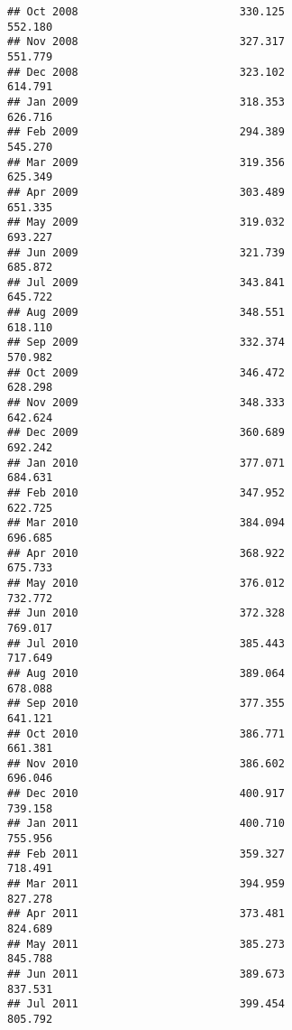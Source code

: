 \documentclass[
]{article}
\begin{document}
\begin{verbatim}
## Oct 2008                         330.125                           552.180
## Nov 2008                         327.317                           551.779
## Dec 2008                         323.102                           614.791
## Jan 2009                         318.353                           626.716
## Feb 2009                         294.389                           545.270
## Mar 2009                         319.356                           625.349
## Apr 2009                         303.489                           651.335
## May 2009                         319.032                           693.227
## Jun 2009                         321.739                           685.872
## Jul 2009                         343.841                           645.722
## Aug 2009                         348.551                           618.110
## Sep 2009                         332.374                           570.982
## Oct 2009                         346.472                           628.298
## Nov 2009                         348.333                           642.624
## Dec 2009                         360.689                           692.242
## Jan 2010                         377.071                           684.631
## Feb 2010                         347.952                           622.725
## Mar 2010                         384.094                           696.685
## Apr 2010                         368.922                           675.733
## May 2010                         376.012                           732.772
## Jun 2010                         372.328                           769.017
## Jul 2010                         385.443                           717.649
## Aug 2010                         389.064                           678.088
## Sep 2010                         377.355                           641.121
## Oct 2010                         386.771                           661.381
## Nov 2010                         386.602                           696.046
## Dec 2010                         400.917                           739.158
## Jan 2011                         400.710                           755.956
## Feb 2011                         359.327                           718.491
## Mar 2011                         394.959                           827.278
## Apr 2011                         373.481                           824.689
## May 2011                         385.273                           845.788
## Jun 2011                         389.673                           837.531
## Jul 2011                         399.454                           805.792

\end{verbatim}
\end{document}

